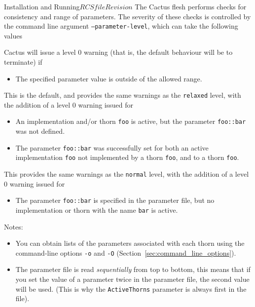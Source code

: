 \begin{cactuspart}{Installation and Running}{$RCSfile$}{$Revision$}
The Cactus flesh performs checks for consistency and range of parameters.
The severity of these checks is controlled by the command line argument
\texttt{--parameter-level}, which can take the following values
\begin{Lentry}
\item[\texttt{relaxed}] Cactus will issue a level 0 warning (that is, the
default behaviour will be to terminate) if
\begin{itemize}
\item{} The specified parameter value is outside of the allowed range.
\end{itemize}

\item [\texttt{normal}]
This is the default, and provides the same warnings as the
\texttt{relaxed} level, with the addition of a level 0 warning issued for
\begin{itemize}
\item{} An implementation and/or thorn \texttt{foo} is active, but the
        parameter \texttt{foo::bar} was not defined.
\item{} The parameter \texttt{foo::bar} was successfully set for both an
        active implementation \texttt{foo} not implemented by a thorn \texttt{foo},
        and to a thorn \texttt{foo}.
\end{itemize}

\item [\texttt{strict}]
This provides the same warnings as the \texttt{normal} level, with the
addition of a level 0 warning issued for
\begin{itemize}
\item{} The parameter \texttt{foo::bar} is specified in the parameter file,
        but no implementation or thorn with the name \texttt{bar} is active.
\end{itemize}
\end{Lentry}

Notes:

\begin{itemize}

\item{} You can obtain lists of the parameters associated with
each thorn using the command-line options \texttt{-o} and \texttt{-O}
(Section~\ref{sec:command_line_options}).

\item{} The parameter file is read \emph{sequentially} from top to bottom,
        this means that if you set the value of a parameter twice in
        the parameter file, the second value will be used. (This is
        why the \texttt{ActiveThorns} parameter is always first in the file).


\end{itemize}
\end{cactuspart}

